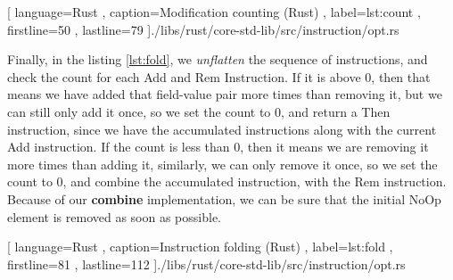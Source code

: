 \begin{code}[H]
  
   [ language=Rust
   , caption={Modification counting (Rust)}
   , label=lst:count
   , firstline=50
   , lastline=79
   ]{./libs/rust/core-std-lib/src/instruction/opt.rs}
\end{code}

Finally, in the listing \ref{lst:fold}, we \textit{unflatten} the sequence of
instructions, and check the count for each Add and Rem Instruction. If it is
above $0$, then that means we have added that field-value pair more times than
removing it, but we can still only add it once, so we set the count to $0$, and
return a Then instruction, since we have the accumulated instructions along with
the current Add instruction. If the count is less than $0$, then it means we are
removing it more times than adding it, similarly, we can only remove it once, so
we set the count to $0$, and combine the accumulated instruction, with the Rem
instruction. Because of our \textbf{combine} implementation, we can be sure that
the initial NoOp element is removed as soon as possible.

\begin{code}[H]
  
   [ language=Rust
   , caption={Instruction folding (Rust)}
   , label=lst:fold
   , firstline=81
   , lastline=112
   ]{./libs/rust/core-std-lib/src/instruction/opt.rs}
\end{code}
